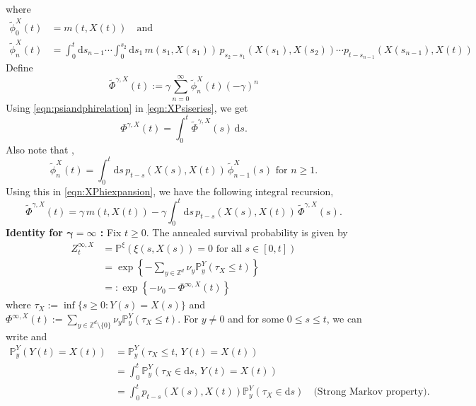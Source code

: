 \documentclass{article}[12pt]
\theoremstyle{definition}
\newcommand{\Z}{\mathbb{Z}}
\newcommand{\pr}{\mathbb{P}}
\newcommand{\1}{\mathbbm{1}}
\newcommand{\dd }{\mathrm{d} }
\begin{document}
where 
\begin{align}
    \tilde{\phi}^X_0(t) &= m(t,X(t))\quad \text{and }\nonumber \\
    \tilde{\phi}^X_n(t) &= \int_0^{t} \dd s_{n-1} \cdots \int_0^{s_2} \dd s_1 \, m(s_1,X(s_1)) \,p_{s_2-s_1}(X(s_1),X(s_2))\cdots p_{t - s_{n-1}}(X(s_{n-1}),X(t))
    \label{eqn:phitilde}
\end{align}
Define
\begin{equation}
  \tilde{\Phi}^{\gamma, X}(t) := \gamma\sum_{n=0}^\infty \tilde{\phi}^X_n(t)(-\gamma)^n
    \label{eqn:XPhiexpansion}
\end{equation}
Using \eqref{eqn:psiandphirelation} in \eqref{eqn:XPsiseries}, we get 
\begin{equation}
    \Phi^{\gamma, X}(t) = \int_0^t \tilde{\Phi}^{\gamma, X}(s)\, \dd s.
    \label{eqn:XPsiasintegral}
\end{equation}
Also note that ,
\begin{equation}
\tilde{\phi}^X_n(t) = \int_{0}^t \dd s\, p_{t-s}(X(s), X(t))\, \tilde{\phi}^X_{n-1}(s)\,\, \text{for } n\ge 1.
\label{eqn:tildephirec}
\end{equation}
Using this in \eqref{eqn:XPhiexpansion}, we have the following integral recursion,
\begin{equation}
   \tilde{\Phi}^{\gamma, X}(t) = \gamma \,m(t,X(t)) - \gamma \int_{0}^t \dd s\, p_{t-s}(X(s),X(t))\,\tilde{\Phi}^{\gamma, X}(s).
    \label{eqn:Phitilderecursion}
\end{equation}
\textbf{Identity for $\mathbf{\gamma = \infty}$ :} Fix $t\geq 0$. The annealed survival probability is given by 
\begin{equation}
    \begin{split}
        Z^{\infty, X}_t &= \pr^\xi\left(\xi(s,X(s)) = 0 \text{ for all } s\in [0,t]\right)\\
        &= \exp\left\{-\sum_{y\in \Z^d} \nu_y \pr^Y_y(\tau_X \le t)\right\}\\
        &=: \exp\left\{-\nu_0 - \Phi^{\infty, X}(t)\right\}
    \end{split}
\label{eqn:Xgammainfinityannealesdefn}
\end{equation}
where $\tau_X := \inf\{s\ge 0 : Y(s) = X(s)\}$ and $\Phi^{\infty, X}(t):= \sum_{y\in \Z^d\setminus \{0\}} \nu_y \pr^Y_y(\tau_X \le t)$. For $y\neq 0$ and for some $0\le s\le t$, we can write and  
\begin{align*}
    \pr^Y_y(Y(t)=X(t)) &= \pr^Y_y(\tau_X\le t, \, Y(t) = X(t))\nonumber\\
    &= \int_0^t \pr^Y_y(\tau_X \in \dd s,\, Y(t) = X(t)) \nonumber\\
    &=  \int_0^t p_{t-s}( X(s),X(t))\pr^Y_y(\tau_X \in \dd s) \quad \text{(Strong Markov property)}.
    \label{eqn:Xstrongmarkovproperty}
\end{align*}
\end{document}
